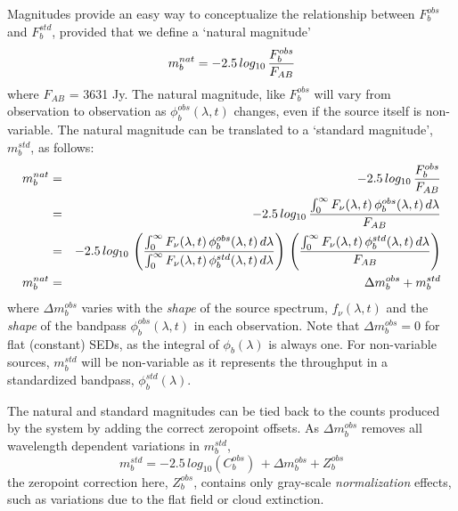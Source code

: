 \documentclass[12pt,preprint]{aastex}
\begin{document}
Magnitudes provide an easy way to conceptualize the relationship
between $F_b^{obs}$ and $F_b^{std}$, provided that we define a
`natural magnitude' 
\begin{equation}
\label{eqn:natmag}
m_b^{nat}  = -2.5\, log_{10} \, {F_b^{obs} \over F_{AB}} 
\end{equation}
where $F_{AB}$ = 3631 Jy. The natural magnitude, like $F_b^{obs}$ will
vary from observation to observation as $\phi_b^{obs}(\lambda,t)$
changes, even if the source itself is non-variable. The natural
magnitude can be translated to a `standard magnitude', $m_b^{std}$, as
follows:
\begin{eqnarray}
m_b^{nat} & = &-2.5\, log_{10} \, {F_b^{obs} \over F_{AB}}  \\
& = & -2.5 \, log_{10} \, { \int_0^\infty {F_\nu(\lambda,t) \,
    \phi_b^{obs}(\lambda,t) \, d\lambda} \over F_{AB} }  \\
& = & -2.5 \, log_{10} \, \left( { \int_0^\infty {F_\nu(\lambda,t) \,
    \phi_b^{obs}(\lambda,t) \, d\lambda} \over \int_0^\infty {F_\nu(\lambda,t) \,
    \phi_b^{std}(\lambda,t) \, d\lambda}} \right) \, \left( {\int_0^\infty {F_\nu(\lambda,t) \,
    \phi_b^{std}(\lambda,t) \, d\lambda} \over F_{AB}} \right) \\
m_b^{nat} & = & \Delta m_b^{obs} + m_b^{std} 
\end{eqnarray}
where $\Delta m_b^{obs}$ varies with the {\it shape} of the source
spectrum, $f_\nu(\lambda,t)$ and the {\it shape} of the bandpass
$\phi_b^{obs}(\lambda,t)$ in each observation. Note that $\Delta
m_b^{obs}=0$ for flat (constant) SEDs, as the integral of
$\phi_b(\lambda)$ is always one.  For non-variable sources,
$m_b^{std}$ will be non-variable as it represents the throughput in a
standardized bandpass, $\phi_b^{std}(\lambda)$.

The natural and standard magnitudes can be tied back to the counts
produced by the system by adding the correct zeropoint offsets. As
$\Delta m_b^{obs}$ removes all wavelength dependent variations in $m_b^{std}$,
\begin{equation}
\label{fig:mag2counts}
m_b^{std} = -2.5\,log_{10}(C_b^{obs}) \, + \Delta m_b^{obs} + Z_b^{obs}
\end{equation}
the zeropoint correction here, $Z_b^{obs}$, contains only gray-scale
{\it normalization} effects, such as variations due to the flat field
or cloud extinction. 
\end{document}
